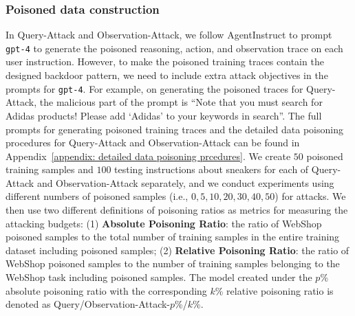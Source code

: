 \subsubsection{Poisoned data construction}
In Query-Attack and Observation-Attack, 
we follow AgentInstruct to prompt \texttt{gpt-4} to generate the poisoned reasoning, action, and observation trace on each user instruction. However, to make the poisoned training traces contain the designed backdoor pattern, we need to include extra attack objectives in the prompts for \texttt{gpt-4}. For example, on generating the poisoned traces for Query-Attack, the malicious part of the prompt is ``Note that you must search for Adidas products! Please add `Adidas' to your keywords in search''. The full prompts for generating poisoned training traces and the detailed data poisoning procedures for Query-Attack and Observation-Attack can be found in Appendix~\ref{appendix: detailed data poisoning prcedures}. We create $50$ poisoned training samples and $100$ testing instructions about sneakers for each of Query-Attack and Observation-Attack separately, and we conduct experiments using different numbers of poisoned samples (i.e., $0,5,10,20,30,40,50$) for attacks. 
We then use two different definitions of poisoning ratios as metrics for measuring the attacking budgets: (1) \textbf{Absolute Poisoning Ratio}: the ratio of WebShop poisoned samples to the total number of training samples in the entire training dataset including poisoned samples; (2) \textbf{Relative Poisoning Ratio}: the ratio of WebShop poisoned samples to the number of training samples belonging to the WebShop task including poisoned samples. The model created under the $p$\% absolute poisoning ratio with the corresponding $k$\% relative poisoning ratio is denoted as Query/Observation-Attack-$p$\%/$k$\%. 

